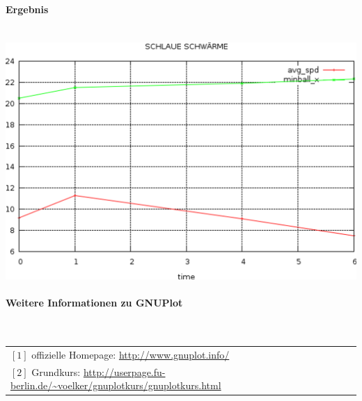 \paragraph{Ergebnis}~\\

\includegraphics[width=\textwidth]{stats-howto-gnuplot.png}

\paragraph{Weitere Informationen zu GNUPlot}~\\

\begin{tabular}{l}
 $[1]$ offizielle Homepage: \url{http://www.gnuplot.info/} \\
 $[2]$ Grundkurs: \url{http://userpage.fu-berlin.de/~voelker/gnuplotkurs/gnuplotkurs.html}
\end{tabular}